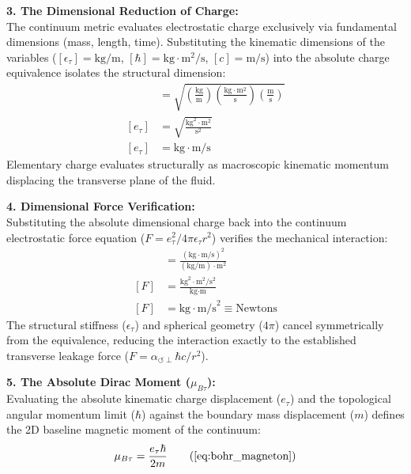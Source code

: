 \documentclass[11pt, a4paper]{article}
\begin{document}
\textbf{3. The Dimensional Reduction of Charge:} \\
The continuum metric evaluates electrostatic charge exclusively via fundamental dimensions (mass, length, time). Substituting the kinematic dimensions of the variables ($[\epsilon_{\tau}] = \text{kg/m}$, $[\hbar] = \text{kg}\cdot\text{m}^2/\text{s}$, $[c] = \text{m/s}$) into the absolute charge equivalence isolates the structural dimension:
\begin{align}
    [e_{\tau}] &= \sqrt{\left(\frac{\text{kg}}{\text{m}}\right) \left(\frac{\text{kg}\cdot\text{m}^2}{\text{s}}\right) \left(\frac{\text{m}}{\text{s}}\right)} \nonumber \\
    [e_{\tau}] &= \sqrt{\frac{\text{kg}^2 \cdot \text{m}^2}{\text{s}^2}} \nonumber \\
    [e_{\tau}] &= \text{kg}\cdot\text{m/s} \label{eq:charge_dimension}
\end{align}
Elementary charge evaluates structurally as macroscopic kinematic momentum displacing the transverse plane of the fluid.

\textbf{4. Dimensional Force Verification:} \\
Substituting the absolute dimensional charge back into the continuum electrostatic force equation ($F = e_{\tau}^2 / 4\pi \epsilon_{\tau} r^2$) verifies the mechanical interaction:
\begin{align}
    [F] &= \frac{(\text{kg}\cdot\text{m/s})^2}{(\text{kg/m}) \cdot \text{m}^2} \nonumber \\
    [F] &= \frac{\text{kg}^2\cdot\text{m}^2/\text{s}^2}{\text{kg}\cdot\text{m}} \nonumber \\
    [F] &= \text{kg}\cdot\text{m/s}^2 \equiv \text{Newtons} \label{eq:force_dimension}
\end{align}
The structural stiffness ($\epsilon_{\tau}$) and spherical geometry ($4\pi$) cancel symmetrically from the equivalence, reducing the interaction exactly to the established transverse leakage force ($F = \alpha_{\circlearrowleft \perp} \hbar c / r^2$).

\textbf{5. The Absolute Dirac Moment ($\mu_{B\tau}$):} \\
Evaluating the absolute kinematic charge displacement ($e_{\tau}$) and the topological angular momentum limit ($\hbar$) against the boundary mass displacement ($m$) defines the 2D baseline magnetic moment of the continuum:
\begin{equation}
    \mu_{B\tau} = \frac{e_{\tau} \hbar}{2m} \tag{\ref{eq:bohr_magneton}}
\end{equation}
\end{document}
